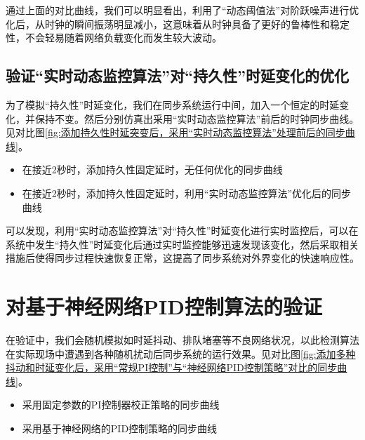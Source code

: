 通过上面的对比曲线，我们可以明显看出，利用了“动态阈值法”对阶跃噪声进行优化后，从时钟的瞬间振荡明显减小，这意味着从时钟具备了更好的鲁棒性和稳定性，不会轻易随着网络负载变化而发生较大波动。

\subsection{验证“实时动态监控算法”对“持久性”时延变化的优化}
为了模拟“持久性”时延变化，我们在同步系统运行中间，加入一个恒定的时延变化，并保持不变。然后分别仿真出采用“实时动态监控算法”前后的时钟同步曲线。见对比图\ref{fig:添加持久性时延突变后，采用“实时动态监控算法”处理前后的同步曲线}。
\begin{itemize}[noitemsep,topsep=0pt,parsep=0pt,partopsep=0pt]
  \item 在接近2秒时，添加持久性固定延时，无任何优化的同步曲线
  \item 在接近2秒时，添加持久性固定延时，利用“实时动态监控算法”优化后的同步曲线
\end{itemize}
\begin{figure}
  \centering
  \hspace{1in}
\end{figure}

可以发现，利用“实时动态监控算法”对“持久性”时延变化进行实时监控后，可以在系统中发生“持久性”时延变化后通过实时监控能够迅速发现该变化，然后采取相关措施后使得同步过程快速恢复正常，这提高了同步系统对外界变化的快速响应性。

\section{对基于神经网络PID控制算法的验证}
在验证中，我们会随机模拟如时延抖动、排队堵塞等不良网络状况，以此检测算法在实际现场中遭遇到各种随机扰动后同步系统的运行效果。见对比图\ref{fig:添加多种抖动和时延变化后，采用“常规PI控制”与“神经网络PID控制策略”对比的同步曲线}。
\begin{itemize}[noitemsep,topsep=0pt,parsep=0pt,partopsep=0pt]
  \item 采用固定参数的PI控制器校正策略的同步曲线
  \item 采用基于神经网络的PID控制策略的同步曲线
\end{itemize}

